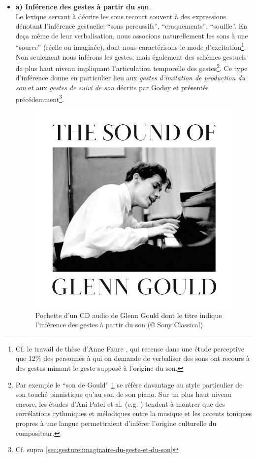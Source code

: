 \vspace{-1em}
\begin{itemize}[noitemsep]
	\item \textbf{a) Inférence des gestes à partir du son}.\\
	Le lexique servant à décrire les sons recourt souvent à des expressions dénotant l'inférence gestuelle: ``sons percussifs'', ``craquements'', ``souffle''. En deça même de leur verbalisation, nous associons naturellement les sons à une ``source'' (réelle ou imaginée), dont nous caractérisons le mode d'excitation\footnote{Cf. le travail de thèse d'Anne Faure \cite{faure_sons_2000}, qui recense dans une étude perceptive que 12\% des personnes à qui on demande de verbaliser des sons ont recours à des gestes mimant le geste supposé à l'origine du son.}. Non seulement nous inférons les gestes, mais également des schèmes gestuels de plus haut niveau impliquant l'articulation temporelle des gestes\footnote{Par exemple le ``son de Gould'' \ref{fig:gesture:Gould} se réfère davantage au style particulier de son touché pianistique qu'au son de son piano. Sur un plus haut niveau encore, les études d'Ani Patel et al. (e.g. \cite{patel_comparing_2006}) tendent à montrer que des corrélations rythmiques et mélodiques entre la musique et les accents toniques propres à une langue permettraient d'inférer l'origine culturelle du compositeur.}. Ce type d'inférence donne en particulier lieu aux \textit{gestes d'imitation de production du son} et aux \textit{gestes de suivi de son} décrits par Godøy et présentés précédemment\footnote{Cf. supra \ref{sec:gesture:imaginaire-du-geste-et-du-son}}.

	\begin{figure}[!htbp]
	\begin{flushright}
		\begin{minipage}[t]{0.93\linewidth}
			\captionsetup{format=plain}%
			\centering
			\includegraphics[width=0.6\linewidth]{gfx/03_gesture/CD-cover-theSoundOfGlennGould2.jpg}
			\caption[Pochette d'un CD audio de Glenn Gould]{Pochette d'un CD audio de Glenn Gould dont le titre indique l'inférence des gestes à partir du son (© Sony Classical)}
			\label{fig:gesture:Gould}
		\end{minipage}
	\end{flushright}
	\end{figure}


\end{itemize}
